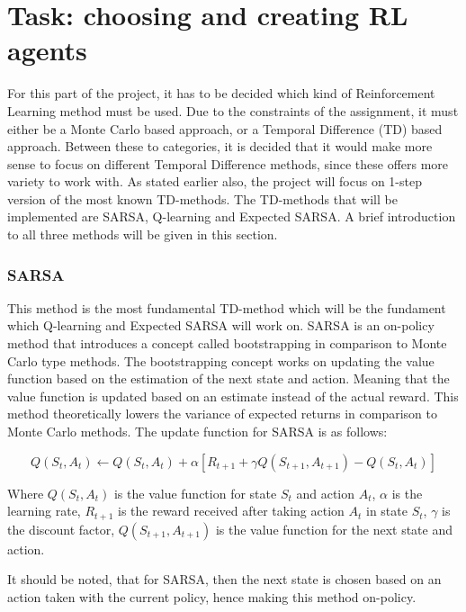 \chapter{Task: choosing and creating RL agents} \label{ch:RL_methods}

For this part of the project, it has to be decided which kind of Reinforcement Learning method must be used. Due to the constraints of the assignment, it must either be a Monte Carlo based approach, or a Temporal Difference (TD) based approach. Between these to categories, it is decided that it would make more sense to focus on different Temporal Difference methods, since these offers more variety to work with. As stated earlier also, the project will focus on 1-step version of the most known TD-methods. The TD-methods that will be implemented are SARSA, Q-learning and Expected SARSA.
A brief introduction to all three methods will be given in this section.

\subsection{SARSA}
This method is the most fundamental TD-method which will be the fundament which Q-learning and Expected SARSA will work on. SARSA is an on-policy method that introduces a concept called bootstrapping in comparison to Monte Carlo type methods. The bootstrapping concept works on updating the value function based on the estimation of the next state and action. Meaning that the value function is updated based on an estimate instead of the actual reward. This method theoretically lowers the variance of expected returns in comparison to Monte Carlo methods. The update function for SARSA is as follows:

\begin{equation}
    Q(S_t, A_t) \leftarrow Q(S_t, A_t) + \alpha \left[ R_{t+1} + \gamma Q(S_{t+1}, A_{t+1}) - Q(S_t, A_t) \right]
\end{equation}

Where $Q(S_t, A_t)$ is the value function for state $S_t$ and action $A_t$, $\alpha$ is the learning rate, $R_{t+1}$ is the reward received after taking action $A_t$ in state $S_t$, $\gamma$ is the discount factor, $Q(S_{t+1}, A_{t+1})$ is the value function for the next state and action.

It should be noted, that for SARSA, then the next state is chosen based on an action taken with the current policy, hence making this method on-policy.

